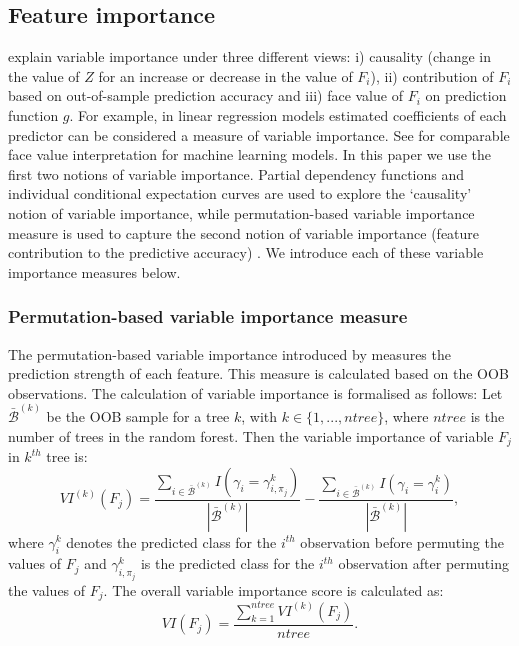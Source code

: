 \documentclass[11pt,a4paper,]{article}
\begin{document}
\hypertarget{feature-importance}{%
\subsection{Feature importance}\label{feature-importance}}

\textcite{jiang2002} explain variable importance under three different views: i) causality (change in the value of \(Z\) for an increase or decrease in the value of \(F_i\)), ii) contribution of \(F_i\) based on out-of-sample prediction accuracy and iii) face value of \(F_i\) on prediction function \(g\). For example, in linear regression models estimated coefficients of each predictor can be considered a measure of variable importance. See \textcite{jiang2002} for comparable face value interpretation for machine learning models. In this paper we use the first two notions of variable importance. Partial dependency functions and individual conditional expectation curves are used to explore the `causality' notion of variable importance, while permutation-based variable importance measure is used to capture the second notion of variable importance (feature contribution to the predictive accuracy) \autocite{zhao2019causal}. We introduce each of these variable importance measures below.

\hypertarget{permutation-based-variable-importance-measure}{%
\subsubsection{Permutation-based variable importance measure}\label{permutation-based-variable-importance-measure}}

The permutation-based variable importance introduced by \textcite{breiman2001random} measures the prediction
strength of each feature. This measure is calculated based on the OOB observations. The calculation of variable importance is formalised as follows: Let \(\bar{\mathcal{B}}^{(k)}\) be the OOB sample for a tree \(k\), with \(k\in \{1,...,ntree\}\), where \(ntree\) is the number of trees in the random forest. Then the variable importance of variable \(F_{j}\) in \(k^{th}\) tree is:
\[VI^{(k)}(F_{j})=\frac{\sum_{i\in \bar{\mathcal{B}}^{(k)}}I(\gamma_{i}=\gamma_{i,\pi_{j}}^{k})}{|\bar{\mathcal{B}}^{(k)}|}-\frac{\sum_{i\in \bar{\mathcal{B}}^{(k)}}I(\gamma_{i}=\gamma_{i}^{k})}{|\bar{\mathcal{B}}^{(k)}|},\]
where \(\gamma_{i}^{k}\) denotes the predicted class for the \(i^{th}\) observation before permuting the values of \(F_{j}\) and \(\gamma_{i, \pi_{j}}^{k}\) is the predicted class for the \(i^{th}\) observation after permuting the values of \(F_{j}\). The overall variable importance score is calculated as:
\[VI(F_{j})=\frac{\sum_{k=1}^{ntree}VI^{(k)}(F_{j})}{ntree}.\]
\end{document}
